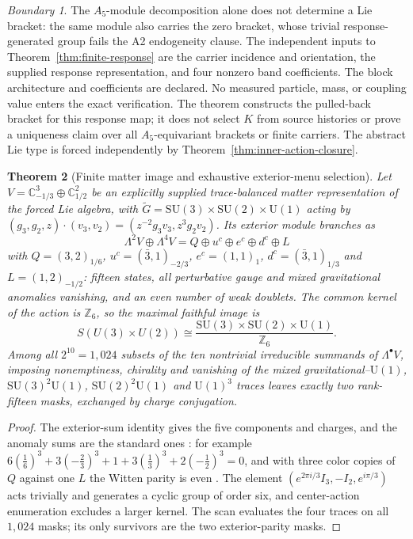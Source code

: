\documentclass[11pt]{article}
\newtheorem{theorem}{Theorem}[section]
\theoremstyle{definition}
\theoremstyle{remark}
\newtheorem{boundary}[theorem]{Boundary}
\begin{document}
\begin{boundary}
The $A_5$-module decomposition alone does not determine a Lie bracket: the
same module also carries the zero bracket, whose trivial response-generated
group fails the A2 endogeneity clause. The independent inputs to
Theorem~\ref{thm:finite-response} are the carrier incidence and orientation,
the supplied response representation, and four nonzero band coefficients.
The block architecture and coefficients are declared. No measured particle,
mass, or coupling value enters the exact verification. The theorem constructs
the pulled-back bracket for this response map; it does not select $K$ from
source histories or prove a uniqueness claim over all $A_5$-equivariant
brackets or finite carriers. The abstract Lie type is forced independently by
Theorem~\ref{thm:inner-action-closure}.
\end{boundary}

\begin{theorem}[Finite matter image and exhaustive exterior-menu selection]
\label{thm:matter-image}
Let $V=\mathbb C^3_{-1/3}\oplus\mathbb C^2_{1/2}$ be an explicitly supplied
trace-balanced matter representation of the forced Lie algebra, with
$\widetilde G=\mathrm{SU}(3)\times\mathrm{SU}(2)\times\mathrm U(1)$ acting by
$(g_3,g_2,z)\cdot(v_3,v_2)=(z^{-2}g_3v_3,z^3g_2v_2)$. Its exterior module
branches as
\begin{equation}
\Lambda^2V\oplus\Lambda^4V
=Q\oplus u^c\oplus e^c\oplus d^c\oplus L
\label{eq:generation}
\end{equation}
with $Q=(3,2)_{1/6}$, $u^c=(\bar3,1)_{-2/3}$, $e^c=(1,1)_1$,
$d^c=(\bar3,1)_{1/3}$ and $L=(1,2)_{-1/2}$: fifteen states, all
perturbative gauge and mixed gravitational anomalies vanishing, and an even
number of weak doublets. The common kernel of the action is $\mathbb Z_6$,
so the maximal faithful image is
\begin{equation}
S(U(3)\times U(2))
\cong
\frac{\mathrm{SU}(3)\times\mathrm{SU}(2)\times\mathrm U(1)}
{\mathbb Z_6}.
\label{eq:globalform}
\end{equation}
Among all $2^{10}=1{,}024$ subsets of the ten nontrivial irreducible summands
of $\Lambda^\bullet V$, imposing nonemptiness, chirality and vanishing of the
mixed gravitational--$\mathrm U(1)$, $\mathrm{SU}(3)^2\mathrm U(1)$,
$\mathrm{SU}(2)^2\mathrm U(1)$ and $\mathrm U(1)^3$ traces leaves exactly two
rank-fifteen masks, exchanged by charge conjugation.
\end{theorem}

\begin{proof}
The exterior-sum identity gives the five components and charges, and the
anomaly sums are the standard ones \cite{bouchiat1972}: for example
$6(\tfrac16)^3+3(-\tfrac23)^3+1+3(\tfrac13)^3+2(-\tfrac12)^3=0$, and with
three color copies of $Q$ against one $L$ the Witten parity is even
\cite{witten82}. The element $(e^{2\pi i/3}I_3,-I_2,e^{i\pi/3})$ acts
trivially and generates a cyclic group of order six, and center-action
enumeration excludes a larger kernel. The scan evaluates the four traces on
all $1{,}024$ masks; its only survivors are the two exterior-parity masks.
\end{proof}
\end{document}
